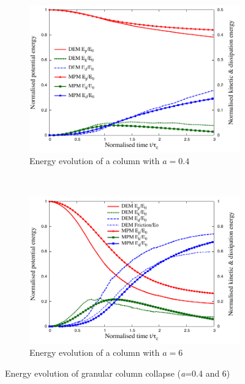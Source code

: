\begin{figure}[tbhp]
\centering
\begin{subfigure}[b]{0.975\textwidth}
\includegraphics[width=\textwidth]{a04_energy}
\caption{Energy evolution of a column with $a=0.4$}
\label{fig:a04_energy}
\end{subfigure}
\\
\begin{subfigure}[b]{0.975\textwidth}
\centering
\includegraphics[width=\textwidth]{a6_energy}
\caption{Energy evolution of a column with $a=6$}
\label{fig:a6_energy}
\end{subfigure}
\caption{Energy evolution of granular column collapse (\textit{a}=0.4 and 6)}
\label{fig:column_energy}
\end{figure}

